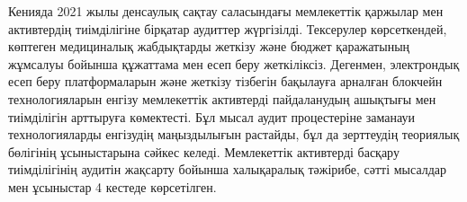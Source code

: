 \begin{multicols}{2}
Кенияда 2021 жылы денсаулық сақтау саласындағы мемлекеттік қаржылар мен
активтердің тиімділігіне бірқатар аудиттер жүргізілді. Тексерулер
көрсеткендей, көптеген медициналық жабдықтарды жеткізу және бюджет
қаражатының жұмсалуы бойынша құжаттама мен есеп беру жеткіліксіз.
Дегенмен, электрондық есеп беру платформаларын және жеткізу тізбегін
бақылауға арналған блокчейн технологияларын енгізу мемлекеттік
активтерді пайдаланудың ашықтығы мен тиімділігін арттыруға көмектесті.
Бұл мысал аудит процестеріне заманауи технологияларды енгізудің
маңыздылығын растайды, бұл да зерттеудің теориялық бөлігінің
ұсыныстарына сәйкес келеді. Мемлекеттік активтерді басқару тиімділігінің
аудитін жақсарту бойынша халықаралық тәжірибе, сәтті мысалдар мен
ұсыныстар 4 кестеде көрсетілген.
\end{multicols}

